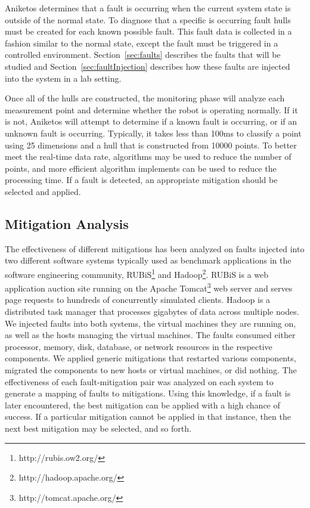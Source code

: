 Aniketos determines that a fault is occurring when the current system state is
outside of the normal state. To diagnose that a specific is occurring fault
hulls must be created for each known possible fault. This fault data is
collected in a fashion similar to the normal state, except the fault must be
triggered in a controlled environment. Section~\ref{sec:faults} describes the
faults that will be studied and Section~\ref{sec:faultInjection} describes how
these faults are injected into the system in a lab setting.

Once all of the hulls are constructed, the monitoring phase will analyze each
measurement point and determine whether the robot is operating normally. If it
is not, Aniketos will attempt to determine if a known fault is occurring, or if
an unknown fault is occurring.  Typically, it takes less than 100ms to classify
a point using 25 dimensions and a hull that is constructed from 10000 points.
To better meet the real-time data rate, algorithms may be used to reduce the
number of points, and more efficient algorithm implements can be used to reduce
the processing time. If a fault is detected, an appropriate mitigation should
be selected and applied.


\subsection{Mitigation Analysis}
\label{sub:mitigationanalysis}
The effectiveness of different mitigations has been analyzed on faults injected
into two different software systems typically used as benchmark applications in
the software engineering community, RUBiS\footnote{http://rubis.ow2.org/} and
Hadoop\footnote{http://hadoop.apache.org/}. RUBiS is a web application auction
site running on the Apache Tomcat\footnote{http://tomcat.apache.org/} web
server and serves page requests to hundreds of concurrently simulated
clients. Hadoop is a distributed task manager that processes gigabytes of data
across multiple nodes. We injected faults into both systems, the virtual
machines they are running on, as well as the hosts managing the virtual
machines. The faults consumed either processor, memory, disk, database, or
network resources in the respective components. We applied generic mitigations
that restarted various components, migrated the components to new hosts or
virtual machines, or did nothing. The effectiveness of each fault-mitigation
pair was analyzed on each system to generate a mapping of faults to
mitigations. Using this knowledge, if a fault is later encountered, the best
mitigation can be applied with a high chance of success. If a particular
mitigation cannot be applied in that instance, then the next best mitigation
may be selected, and so forth.

